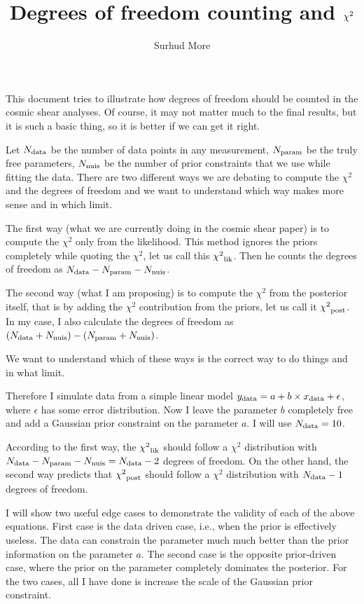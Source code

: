 \documentclass[11pt]{article}
\author{Surhud More}
\title{Degrees of freedom counting and $\chisq$}
\newcommand{\ndata}{{N_{\rm data}}}
\newcommand{\ydata}{{y_{\rm data}}}
\newcommand{\xdata}{{x_{\rm data}}}
\newcommand{\nparam}{{N_{\rm param}}}
\newcommand{\nnuis}{{N_{\rm nuis}}}
\newcommand{\chisq}{{\chi^{2}}}
\begin{document}
\maketitle

This document tries to illustrate how degrees of freedom should be counted in
the cosmic shear analyses. Of course, it may not matter much to the final
results, but it is such a basic thing, so it is better if we can get it right.

Let $\ndata$ be the number of data points in any measurement, $\nparam$
be the truly free parameters, $\nnuis$ be the number of prior constraints
that we use while fitting the data. There are two different ways we are
debating to compute the $\chisq$ and the degrees of freedom and we want to
understand which way makes more sense and in which limit.

The first way (what we are currently doing in the cosmic shear paper) is to
compute the $\chisq$ only from the likelihood. This method ignores the priors
completely while quoting the $\chisq$, let us call this $\chisq_{\rm lik}$.
Then he counts the degrees of freedom as $\ndata-\nparam-\nnuis$.

The second way (what I am proposing) is to compute the $\chisq$ from the
posterior itself, that is by adding the $\chisq$ contribution from the priors,
let us call it $\chisq_{\rm post}$.  In my case, I also calculate the degrees
of freedom as $(\ndata+\nnuis)-(\nparam+\nnuis)$.

We want to understand which of these ways is the correct way to do things and
in what limit.

Therefore I simulate data from a simple linear model $\ydata=a+b\times
\xdata+\epsilon$, where $\epsilon$ has some error distribution. Now I leave the
parameter $b$ completely free and add a Gaussian prior constraint on the
parameter $a$. I will use $\ndata=10$. 

According to the first way, the $\chisq_{\rm lik}$ should follow a $\chisq$
distribution with $\ndata-\nparam-\nnuis=\ndata-2$ degrees of freedom. On the
other hand, the second way predicts that $\chisq_{\rm post}$ should follow a
$\chisq$ distribution with $\ndata-1$ degrees of freedom.

I will show two useful edge cases to demonstrate the validity of each of the
above equations. First case is the data driven case, i.e., when the prior is
effectively useless. The data can constrain the parameter much much better than
the prior information on the parameter $a$. The second case is the opposite
prior-driven case, where the prior on the parameter completely dominates the
posterior. For the two cases, all I have done is increase the scale of the
Gaussian prior constraint.
\end{document}
